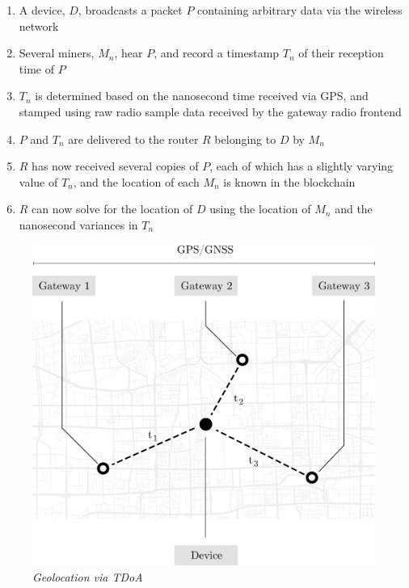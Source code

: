 \documentclass[letterpaper,11pt]{article}
\begin{document}
\begin{enumerate}
        \item A device, $D$, broadcasts a packet $P$ containing arbitrary data via the wireless network
        \item Several miners, $M_n$, hear $P$, and record a timestamp $T_n$ of their reception time of $P$
        \item $T_n$ is determined based on the nanosecond time received via GPS, and stamped using raw radio sample data received by the gateway radio frontend
        \item $P$ and $T_n$ are delivered to the router $R$ belonging to $D$ by $M_n$
        \item $R$ has now received several copies of $P$, each of which has a slightly varying value of $T_n$, and the location of each $M_n$ is known in the blockchain
        \item $R$ can now solve for the location of $D$ using the location of $M_n$ and the nanosecond variances in $T_n$
\end{enumerate}

\begin{figure}[H]
    \begin{center}
          \includegraphics[scale=0.3]{tdoa.eps}
          \caption{\emph{Geolocation via TDoA}}
          \label{fig:tdoa}
     \end{center}
\end{figure}
\end{document}
